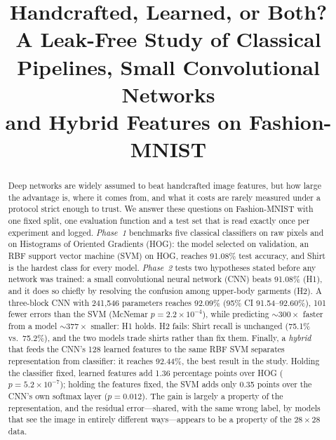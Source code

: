 \documentclass[conference]{IEEEtran}
\begin{document}
\title{Handcrafted, Learned, or Both?\\[2pt]
\large A Leak-Free Study of Classical Pipelines, Small Convolutional Networks\\and Hybrid Features on Fashion-MNIST}

\author{
}

\maketitle

\begin{abstract}
Deep networks are widely assumed to beat handcrafted image features, but how large the advantage is, where it comes
from, and what it costs are rarely measured under a protocol strict enough to trust. We answer these questions on
Fashion-MNIST with one fixed split, one evaluation function and a test set that is read exactly once per experiment and
logged. \emph{Phase~1} benchmarks five classical classifiers on raw pixels and on Histograms of Oriented Gradients (HOG):
the model selected on validation, an RBF support vector machine (SVM) on HOG, reaches 91.08\% test accuracy, and Shirt is
the hardest class for every model. \emph{Phase~2} tests two hypotheses stated before any network was trained: a small
convolutional neural network (CNN) beats 91.08\% (H1), and it does so chiefly by resolving the confusion among
upper-body garments (H2). A three-block CNN with 241{,}546 parameters reaches 92.09\% (95\% CI 91.54--92.60\%), 101 fewer
errors than the SVM (McNemar $p=2.2\times10^{-4}$), while predicting ${\sim}300\times$ faster from a model
${\sim}377\times$ smaller: H1 holds. H2 fails: Shirt recall is unchanged (75.1\% vs.\ 75.2\%), and the two models trade
shirts rather than fix them. Finally, a \emph{hybrid} that feeds the CNN's 128 learned features to the same RBF SVM
separates representation from classifier: it reaches 92.44\%, the best result in the study. Holding the classifier fixed,
learned features add 1.36 percentage points over HOG ($p=5.2\times10^{-7}$); holding the features fixed, the SVM adds
only 0.35 points over the CNN's own softmax layer ($p=0.012$). The gain is largely a property of the representation, and the
residual error---shared, with the same wrong label, by models that see the image in entirely different ways---appears
to be a property of the $28\times28$ data.
\end{abstract}
\end{document}
